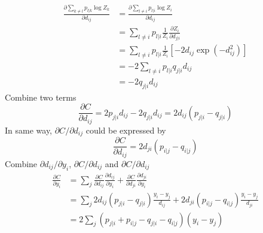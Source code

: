 \documentclass[11pt]{article}
\begin{document}
$$
\begin{aligned}
    \frac{\partial \sum_{k\neq l} p_{l|k}\log Z_k}{\partial d_{ij}} &= 
    \frac{\partial\sum_{l\neq i}p_{l|i}\log Z_i}{\partial d_{ij}}\\ 
    &= \sum_{l\neq i}p_{l|i}\frac{1}{Z_i}\frac{\partial Z_i}{\partial d_{j|i}}\\
    &= \sum_{l\neq i}p_{l|i}\frac{1}{Z_i}\left[-2d_{ij}\exp(-d_{ij}^2)\right]\\
    &= -2\sum_{l\neq i}p_{l|i}q_{j|i}d_{ij}\\
    &= -2q_{j|i}d_{ij}
\end{aligned}
$$
Combine two terms
$$
    \frac{\partial{C}}{\partial d_{ij}} = 2p_{j|i}d_{ij} - 2q_{j|i}d_{ij} = 2d_{ij}(p_{j|i}-q_{j|i})
$$
In same way, $\partial C/\partial d_{ij}$ could be expressed by
$$
    \frac{\partial C}{\partial d_{ij}} = 2d_{ji}(p_{i|j}-q_{i|j})
$$
Combine $\partial{d_{ij}}/\partial{y_i}$, $\partial C/\partial d_{ij}$ and $\partial C/\partial d_{ij}$
$$
\begin{aligned}
    \frac{\partial{C}}{\partial{y_i}} &= \sum_j \frac{\partial{C}}{\partial{d_{ij}}}
    \frac{\partial{d_{ij}}}{\partial{y_i}} +\frac{\partial{C}}{\partial{d_{ji}}}
    \frac{\partial{d_{ji}}}{\partial{y_i}}\\
    &= \sum_j 2d_{ij}(p_{j|i}-q_{j|i})\frac{y_i-y_j}{d_{ij}} + 2d_{ji}(p_{i|j}-q_{i|j})\frac{y_i-y_j}{d_{ji}}\\
    &= 2\sum_j (p_{j|i}+p_{i|j}-q_{j|i}-q_{i|j})(y_i-y_j)
\end{aligned}
$$

\renewcommand\refname{Reference}


\end{document}
